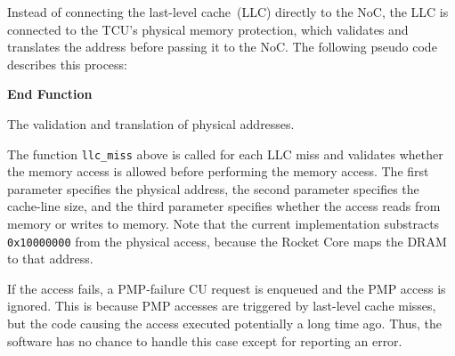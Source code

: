 Instead of connecting the last-level cache~(LLC) directly to the NoC, the LLC is connected to the
TCU's physical memory protection, which validates and translates the address before passing it to
the NoC. The following pseudo code describes this process:\\[.2em]

\begin{algorithm}[H]
    \textbf{End Function}
    \caption{The validation and translation of physical addresses.}
    \label{code:pmp}
\end{algorithm}

\noindent The function \texttt{llc\_miss} above is called for each LLC miss and validates whether
the memory access is allowed before performing the memory access. The first parameter specifies the
physical address, the second parameter specifies the cache-line size, and the third parameter
specifies whether the access reads from memory or writes to memory. Note that the current
implementation substracts \texttt{0x10000000} from the physical access, because the Rocket Core maps
the DRAM to that address.

If the access fails, a PMP-failure CU request is enqueued and the PMP access is ignored. This is
because PMP accesses are triggered by last-level cache misses, but the code causing the access
executed potentially a long time ago. Thus, the software has no chance to handle this case except
for reporting an error.
\extend{}

